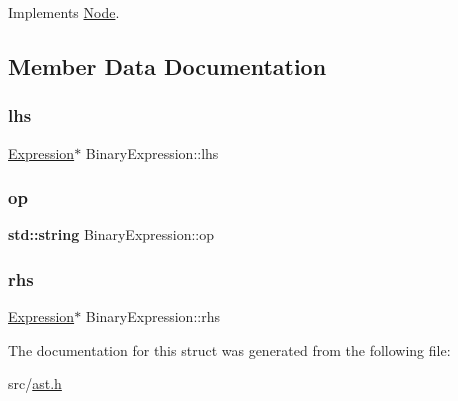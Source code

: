 Implements \hyperlink{struct_node_a82f29420d0a38efcc370352528e94e9b}{Node}.



\subsection{Member Data Documentation}
\mbox{\label{struct_binary_expression_ae689284a646929c99e634e75f50cb32c}} 
\subsubsection{\texorpdfstring{lhs}{lhs}}
{\footnotesize\ttfamily \hyperlink{struct_expression}{Expression}$\ast$ Binary\+Expression\+::lhs}

\mbox{\label{struct_binary_expression_a4c33b66e2ffc0a5ede2cdd190bf4bd75}} 
\subsubsection{\texorpdfstring{op}{op}}
{\footnotesize\ttfamily \textbf{ std\+::string} Binary\+Expression\+::op}

\mbox{\label{struct_binary_expression_ad569ae3b07f428257b0e7a96746ceb32}} 
\subsubsection{\texorpdfstring{rhs}{rhs}}
{\footnotesize\ttfamily \hyperlink{struct_expression}{Expression}$\ast$ Binary\+Expression\+::rhs}



The documentation for this struct was generated from the following file\+:\begin{DoxyCompactItemize}
\item 
src/\hyperlink{ast_8h}{ast.\+h}\end{DoxyCompactItemize}
